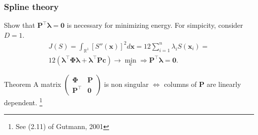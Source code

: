 \documentclass{beamer}
\begin{document}
\begin{frame}
\frametitle{Spline theory}
Show that $\mathbf{P}^\top\boldsymbol{\lambda} = \mathbf{0}$ is necessary for minimizing energy.
For simpicity, consider $D = 1$.
\begin{align*}
  J(S) = \int_{\mathbb{R}^1}[S''(\mathbf{x})]^2d\mathbf{x} = 12\sum_{i=1}^n\lambda_iS(\mathbf{x}_i)= \\
  12(\boldsymbol{\lambda}^\top\mathbf{\Phi}\boldsymbol{\lambda} + \boldsymbol{\lambda}^\top\mathbf{P}\mathbf{c})
  \to \min_{\mathbf{c}} \Rightarrow \mathbf{P}^\top\boldsymbol{\lambda} = \mathbf{0}.
\end{align*} 

\begin{alertblock}{Theorem}
  A matrix $\begin{pmatrix}\mathbf{\Phi} & \mathbf{P} \\ \mathbf{P}^\top & \mathbf{0}\end{pmatrix}$
  is non singular $\Leftrightarrow$ columns of $\mathbf{P}$ are linearly dependent.
  \footnote{See (2.11) of Gutmann, 2001}
  
\end{alertblock}

\end{frame}
\end{document}
